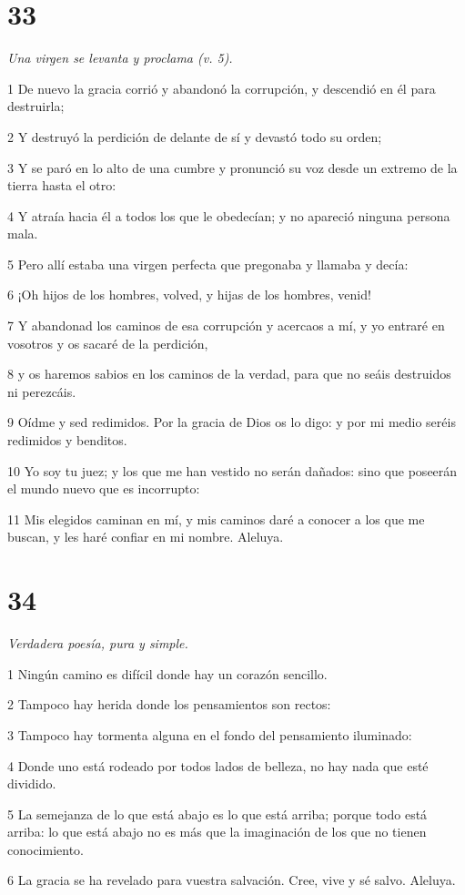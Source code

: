 \chapter{33}

\par \textit{Una virgen se levanta y proclama (v. 5).}

\par 1 De nuevo la gracia corrió y abandonó la corrupción, y descendió en él para destruirla;
\par 2 Y destruyó la perdición de delante de sí y devastó todo su orden;
\par 3 Y se paró en lo alto de una cumbre y pronunció su voz desde un extremo de la tierra hasta el otro:
\par 4 Y atraía hacia él a todos los que le obedecían; y no apareció ninguna persona mala.
\par 5 Pero allí estaba una virgen perfecta que pregonaba y llamaba y decía:
\par 6 ¡Oh hijos de los hombres, volved, y hijas de los hombres, venid!
\par 7 Y abandonad los caminos de esa corrupción y acercaos a mí, y yo entraré en vosotros y os sacaré de la perdición,
\par 8 y os haremos sabios en los caminos de la verdad, para que no seáis destruidos ni perezcáis.
\par 9 Oídme y sed redimidos. Por la gracia de Dios os lo digo: y por mi medio seréis redimidos y benditos.
\par 10 Yo soy tu juez; y los que me han vestido no serán dañados: sino que poseerán el mundo nuevo que es incorrupto:
\par 11 Mis elegidos caminan en mí, y mis caminos daré a conocer a los que me buscan, y les haré confiar en mi nombre. Aleluya.



\chapter{34}

\par \textit{Verdadera poesía, pura y simple.}

\par 1 Ningún camino es difícil donde hay un corazón sencillo.
\par 2 Tampoco hay herida donde los pensamientos son rectos:
\par 3 Tampoco hay tormenta alguna en el fondo del pensamiento iluminado:
\par 4 Donde uno está rodeado por todos lados de belleza, no hay nada que esté dividido.
\par 5 La semejanza de lo que está abajo es lo que está arriba; porque todo está arriba: lo que está abajo no es más que la imaginación de los que no tienen conocimiento.
\par 6 La gracia se ha revelado para vuestra salvación. Cree, vive y sé salvo. Aleluya.

